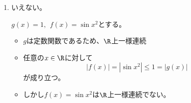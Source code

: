 \begin{souanswer}
\begin{enumerate}
\begin{tcolorbox}
\end{tcolorbox}
    $\epsilon_0= 1$とする。各自然数$n\in \N$に対し、
\begin{equation*}
    x_n= \sqrt{2n\pi+ \frac{\pi}{2}},\ \ y_n= \sqrt{2n\pi}
\end{equation*}
    とおく。このとき
\begin{equation*}
    f(x_n)= \sin{\left(2n\pi+ \frac{\pi}{2}\right)}= 1,\ \ f(y_n)= \sin{2n\pi}= 0
\end{equation*}
    より
\begin{equation*}
    |f(x_n)- f(y_n)|= |1- 0|= 1\ge \epsilon_0
\end{equation*}
    となる。一方で2点間の距離は
\begin{align*}
    |x_n- y_n|
    &= \sqrt{2n\pi+ \frac{\pi}{2}}- \sqrt{2n\pi}\\
    &= \frac{\pi/2}{\sqrt{2n\pi+ \frac{\pi}{2}}+ \sqrt{2n\pi}}
\end{align*}
    と評価でき、$n\to +\infty$のとき、$|x_n- y_n|\to 0$。したがって任意の$\delta> 0$に対して十分大きな$n$を選べば、$|x_n- y_n|< \delta$かつ$|f(x_n)- f(y_n)|\ge 1$をみたす点対が取れるため、$f$は$\R$上一様連続ではない。
    \item いえない。
\begin{tcolorbox}[title= 反例]
    $g(x)= 1,\ \ f(x)= \sin{x^2}$とする。
\begin{itemize}
    \item $g$は定数関数であるため、$\R$上一様連続
    \item 任意の$x\in \R$に対して
\begin{equation*}
    |f(x)|= |\sin{x^2}|\le 1= |g(x)|
\end{equation*}
    が成り立つ。
    \item しかし$f(x)= \sin{x^2}$は$\R$上一様連続でない。
\end{itemize}
\end{tcolorbox}
\end{enumerate}
\end{souanswer}
